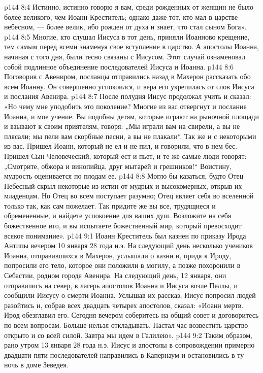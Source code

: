 \vs p144 8:4 Истинно, истинно говорю я вам, среди рожденных от женщин не было более великого, чем Иоанн Креститель; однако даже тот, кто мал в царстве небесном, --- более велик, ибо рожден от духа и знает, что стал сыном Бога».
\vs p144 8:5 Многие, кто слушал Иисуса в тот день, приняли Иоанново крещение, тем самым перед всеми знаменуя свое вступление в царство. А апостолы Иоанна, начиная с того дня, были тесно связаны с Иисусом. Этот случай ознаменовал собой подлинное объединение последователей Иисуса и Иоанна.
\vs p144 8:6 Поговорив с Авениром, посланцы отправились назад в Махерон рассказать обо всем Иоанну. Он совершенно успокоился, и вера его укрепилась от слов Иисуса и послания Авенира.
\vs p144 8:7 После полудня Иисус продолжал учить и сказал: «Но чему мне уподобить это поколение? Многие из вас отвергнут и послание Иоанна, и мое учение. Вы подобны детям, которые играют на рыночной площади и взывают к своим приятелям, говоря: „Мы играли вам на свирели, а вы не плясали; мы пели вам скорбные песни, а вы не плакали“. Так же и с некоторыми из вас. Пришел Иоанн, который не ел и не пил, и говорили, что в нем бес. Пришел Сын Человеческий, который ест и пьет, и те же самые люди говорят: „Смотрите, обжора и винопийца, друг мытарей и грешников!“ Воистину, мудрость оценивается по плодам ее.
\vs p144 8:8 Могло бы казаться, будто Отец Небесный скрыл некоторые из истин от мудрых и высокомерных, открыв их младенцам. Но Отец во всем поступает разумно; Отец являет себя во вселенной только так, как сам пожелает. Так придите же вы все, трудящиеся и обремененные, и найдете успокоение для ваших душ. Возложите на себя божественное иго, и вы испытаете божественный мир, который превосходит всякое понимание».
\vs p144 9:1 Иоанн Креститель был казнен по приказу Ирода Антипы вечером 10 января 28 года н.э. На следующий день несколько учеников Иоанна, отправившихся в Махерон, услышали о казни и, придя к Ироду, попросили его тело, которое они положили в могилу, а позже похоронили в Себастии, родном городе Авенира. На следующий день, 12 января, они отправились на север, в лагерь апостолов Иоанна и Иисуса возле Пеллы, и сообщили Иисусу о смерти Иоанна. Услышав их рассказ, Иисус попросил людей разойтись и, собрав всех двадцать четырех апостолов, сказал: «Иоанн мертв. Ирод обезглавил его. Сегодня вечером соберитесь на общий совет и договоритесь по всем вопросам. Больше нельзя откладывать. Настал час возвестить царство открыто и со всей силой. Завтра мы идем в Галилею».
\vs p144 9:2 Таким образом, рано утром 13 января 28 года н.э. Иисус и апостолы в сопровождении примерно двадцати пяти последователей направились в Капернаум и остановились в ту ночь в доме Зеведея.

